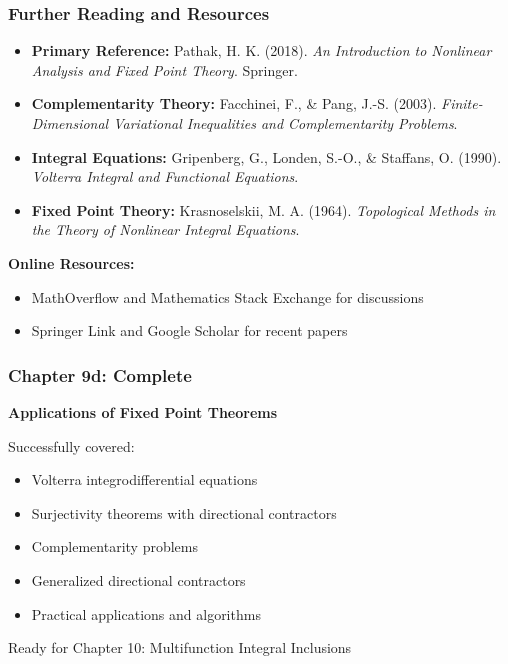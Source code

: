 \documentclass[aspectratio=169,10pt]{beamer}
\begin{document}
\begin{frame}
    \frametitle{Further Reading and Resources}

    \begin{itemize}
        \item \textbf{Primary Reference:} Pathak, H. K. (2018). \textit{An Introduction to Nonlinear Analysis and Fixed Point Theory}. Springer.

        \item \textbf{Complementarity Theory:} Facchinei, F., \& Pang, J.-S. (2003). \textit{Finite-Dimensional Variational Inequalities and Complementarity Problems}.

        \item \textbf{Integral Equations:} Gripenberg, G., Londen, S.-O., \& Staffans, O. (1990). \textit{Volterra Integral and Functional Equations}.

        \item \textbf{Fixed Point Theory:} Krasnoselskii, M. A. (1964). \textit{Topological Methods in the Theory of Nonlinear Integral Equations}.
    \end{itemize}

    \bigskip

    \textbf{Online Resources:}
    \begin{itemize}
        \item MathOverflow and Mathematics Stack Exchange for discussions
        \item Springer Link and Google Scholar for recent papers
    \end{itemize}
\end{frame}

\begin{frame}
    \frametitle{Chapter 9d: Complete}

    \begin{center}
        \Large
        \textbf{Applications of Fixed Point Theorems}

        \bigskip

        Successfully covered:
        \begin{itemize}
            \item Volterra integrodifferential equations
            \item Surjectivity theorems with directional contractors
            \item Complementarity problems
            \item Generalized directional contractors
            \item Practical applications and algorithms
        \end{itemize}

        \bigskip

        Ready for Chapter 10: Multifunction Integral Inclusions
    \end{center}
\end{frame}
\end{document}
